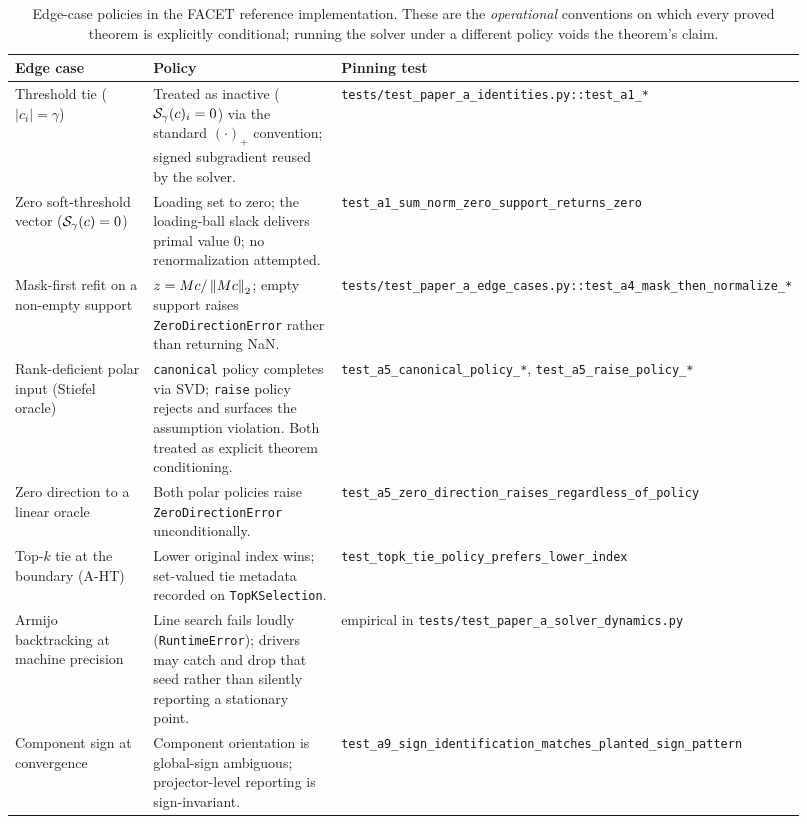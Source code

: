 \begin{table}[t]
\centering
\caption{Edge-case policies in the FACET reference implementation. These are the \emph{operational} conventions on which every proved theorem is explicitly conditional; running the solver under a different policy voids the theorem's claim.}
\label{tab:a-edge-case-policies}
\small
\begin{tabular}{p{0.26\linewidth}p{0.32\linewidth}p{0.34\linewidth}}
\toprule
Edge case & Policy & Pinning test \\
\midrule
Threshold tie ($|c_i|=\gamma$) & Treated as inactive ($\mathcal{S}_\gamma(c)_i=0$) via the standard $(\cdot)_+$ convention; signed subgradient reused by the solver. & \texttt{tests/test\_paper\_a\_identities.py::test\_a1\_*} \\
\addlinespace
Zero soft-threshold vector ($\mathcal{S}_\gamma(c)=0$) & Loading set to zero; the loading-ball slack delivers primal value $0$; no renormalization attempted. & \texttt{test\_a1\_sum\_norm\_zero\_support\_returns\_zero} \\
\addlinespace
Mask-first refit on a non-empty support & $z = M c / \left\lVert Mc \right\rVert_2$; empty support raises \texttt{ZeroDirectionError} rather than returning NaN. & \texttt{tests/test\_paper\_a\_edge\_cases.py::test\_a4\_mask\_then\_normalize\_*} \\
\addlinespace
Rank-deficient polar input (Stiefel oracle) & \texttt{canonical} policy completes via SVD; \texttt{raise} policy rejects and surfaces the assumption violation. Both treated as explicit theorem conditioning. & \texttt{test\_a5\_canonical\_policy\_*}, \texttt{test\_a5\_raise\_policy\_*} \\
\addlinespace
Zero direction to a linear oracle & Both polar policies raise \texttt{ZeroDirectionError} unconditionally. & \texttt{test\_a5\_zero\_direction\_raises\_regardless\_of\_policy} \\
\addlinespace
Top-$k$ tie at the boundary (A-HT) & Lower original index wins; set-valued tie metadata recorded on \texttt{TopKSelection}. & \texttt{test\_topk\_tie\_policy\_prefers\_lower\_index} \\
\addlinespace
Armijo backtracking at machine precision & Line search fails loudly (\texttt{RuntimeError}); drivers may catch and drop that seed rather than silently reporting a stationary point. & empirical in \texttt{tests/test\_paper\_a\_solver\_dynamics.py} \\
\addlinespace
Component sign at convergence & Component orientation is global-sign ambiguous; projector-level reporting is sign-invariant. & \texttt{test\_a9\_sign\_identification\_matches\_planted\_sign\_pattern} \\
\bottomrule
\end{tabular}
\end{table}
